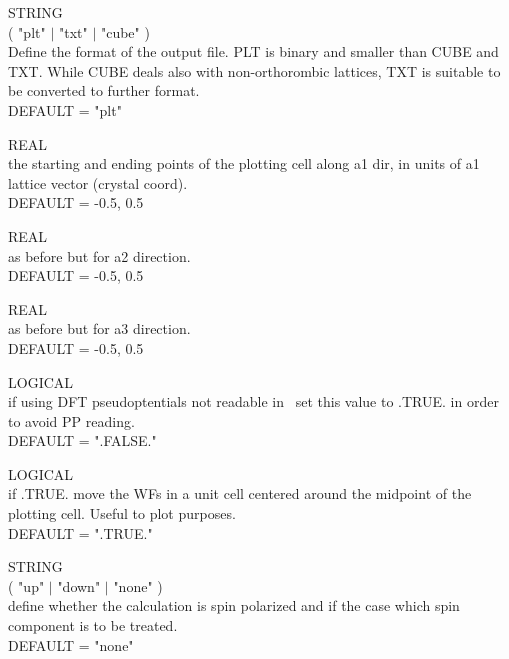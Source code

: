 {\noindent{}%
STRING \\ ( "plt" $\mid$ "txt" $\mid$ "cube" )\\
              Define the format of the output file. PLT is binary and smaller than
              CUBE and TXT. While CUBE deals also with non-orthorombic lattices, TXT
              is suitable to be converted to further format.\\
              DEFAULT = "plt" \par

\noindent{}%
REAL \\ the starting and ending points of the plotting cell along a1 dir,
              in units of a1 lattice vector (crystal coord).\\
              DEFAULT = -0.5, 0.5 \par

\noindent{}%
REAL \\ as before but for a2 direction.\\
              DEFAULT = -0.5, 0.5 \par

\noindent{}%
REAL \\ as before but for a3 direction.\\
              DEFAULT = -0.5, 0.5 \par

\noindent{}%
LOGICAL \\ if using DFT pseudoptentials not readable in \WANT\ set this value to
              .TRUE. in order to avoid PP reading.\\
              DEFAULT = ".FALSE." \par

\noindent{}%
LOGICAL \\ if .TRUE. move the WFs in a unit cell centered around the midpoint of the
              plotting cell. Useful to plot purposes.\\
              DEFAULT = ".TRUE." \par

\noindent{}%
STRING \\ ( "up" $\mid$ "down" $\mid$ "none" )\\
              define whether the calculation is spin polarized and if the case
              which spin component is to be treated.\\
              DEFAULT = "none" \par
}
